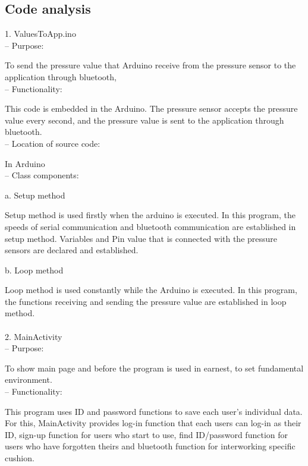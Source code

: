 \documentclass[conference]{IEEEtran}
\begin{document}
\subsection{Code analysis\\}

1. ValuesToApp.ino\\

 -- Purpose: 

To send the pressure value that Arduino receive from the pressure sensor to the application through bluetooth,\\

 --	Functionality:

This code is embedded in the Arduino. The pressure sensor accepts the pressure value every second, and the pressure value is sent to the application through bluetooth. \\

 --	Location of source code:

In Arduino\\

 --	Class components:

a. Setup method 

Setup method is used firstly when the arduino is executed. In this program, the speeds of serial communication and bluetooth communication are established in setup method. Variables and Pin value that is connected with the pressure sensors are declared and established. 

b. Loop method 

Loop method is used constantly while the Arduino is executed. In this program, the functions receiving and sending the pressure value are established in loop method. \\\\

2. MainActivity\\

 --	Purpose:
 
To show main page and before the program is used in earnest, to set fundamental environment.\\

 --	Functionality:
 
This program uses ID and password functions to save each user's individual data. For this, MainActivity provides log-in function that each users can log-in as their ID, sign-up function for users who start to use, find ID/password function for users who have forgotten theirs and bluetooth function for interworking specific cushion. \\
\end{document}
